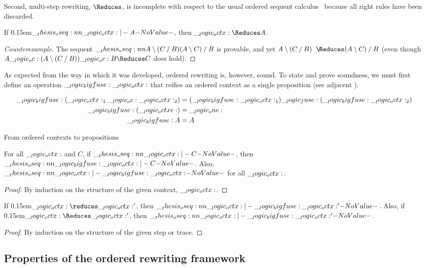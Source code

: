 Second, multi-step rewriting, $\Reduces$, is incomplete with respect to the usual ordered sequent calculus~ because all right rules have been discarded.%
%
 \begin{falseclaim}[Completeness]
  If \kern0.15em$\oseq{\octx |- A}$, then\/ $\octx \Reduces A$.
\end{falseclaim}
%
\begin{proof}[Counterexample]
  The sequent $\oseq{A \limp (C \pmir B) |- (A \limp C) \pmir B}$ is provable, and yet $A \limp (C \pmir B) \Longarrownot\Reduces (A \limp C) \pmir B$ (even though $A \oc (A \limp (C \pmir B)) \oc B \Reduces C$ does hold).
\end{proof}
\noindent
As expected from the way in which it was developed, ordered rewriting is, however, sound.
To state and prove soundness, we must first define an operation $\__logic_bigfuse: \__logic_octx:$ that reifies an ordered context as a single proposition (see adjacent ).%
%
\begin{marginfigure}
  \begin{align*}
    \__logic_bigfuse: (\__logic_octx:_1 \__logic_oc: \__logic_octx:_2) &= (\__logic_bigfuse: \__logic_octx:_1) \__logic_fuse: (\__logic_bigfuse: \__logic_octx:_2) \\
    \__logic_bigfuse: (\__logic_octxe:) &= \__logic_one: \\
    \__logic_bigfuse: A &= A
  \end{align*}
  \caption{From ordered contexts to propositions}\label{fig:ordered-rewriting:bigfuse}
\end{marginfigure}%
%
\begin{lemma}
  For all $\__logic_octx:$ and $C$, if $\oseq{\octx |- C}$, then $\oseq{\bigfuse \octx |- C}$.
  Also, $\oseq{\octx |- \bigfuse \octx}$ for all $\__logic_octx:$.
\end{lemma}
\begin{proof}
  By induction on the structure of the given context, $\__logic_octx:$.
\end{proof}
%
\begin{theorem}[Soundness]
  If \kern0.15em$\octx \reduces \octx'$, then\/ $\oseq{\octx |- \bigfuse \octx'}$.
  Also, if \kern0.15em$\octx \Reduces \octx'$, then\/ $\oseq{\octx |- \bigfuse \octx'}$.
\end{theorem}
%
\begin{proof}
  By induction on the structure of the given step or trace.
\end{proof}



\subsection{Properties of the ordered rewriting framework}\label{sec:ordered-rewriting:concurrency}

